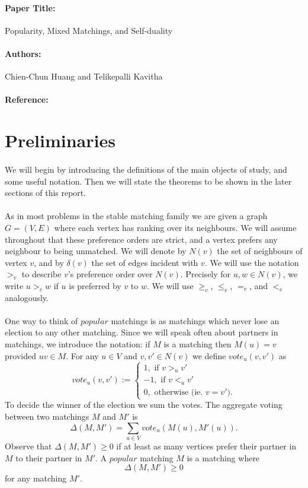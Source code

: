 \documentclass[letterpaper,12pt,oneside,onecolumn]{article}
\begin{document}
\paragraph{Paper Title:} Popularity, Mixed Matchings, and Self-duality
\paragraph{Authors:} Chien-Chun Huang and Telikepalli Kavitha
\paragraph{Reference:} \cite{huang2017popularity}

\section{Preliminaries}
\paragraph{}
We will begin by introducing the definitions of the main objects of study, and some useful notation. Then we will state the theorems to be shown in the later sections of this report.
\paragraph{}
As in most problems in the stable matching family we are given a graph $G=(V,E)$ where each vertex has ranking over its neighbours. We will assume throughout that these preference orders are strict, and a vertex prefers any neighbour to being unmatched. We will denote by $N(v)$ the set of neighbours of vertex $v$, and by $\delta(v)$ the set of edges incident with $v$. We will use the notation $>_v$ to describe $v$'s preference order over $N(v)$. Precisely for $u, w \in N(v)$, we write $u >_v w$ if $u$ is preferred by $v$ to $w$. We will use $\geq_v$, $\leq_v$, $=_v$, and $<_v$ analogously.
\paragraph{}
One way to think of $\textit{popular}$ matchings is as matchings which never lose an election to any other matching. Since we will speak often about partners in matchings, we introduce the notation: if $M$ is a matching then $M(u) = v$ provided $uv \in M$. For any $u \in V$ and $v,v' \in N(v)$ we define $vote_u(v,v')$ as
$$vote_u(v,v') := \begin{cases}
1, \text{ if } v >_u v' \\
-1, \text{ if } v <_u v' \\
0, \text{ otherwise (ie. } v = v').
\end{cases}$$
To decide the winner of the election we sum the votes. The aggregate voting between two matchings $M$ and $M'$ is
$$\Delta(M, M') = \sum_{u \in V} vote_u(M(u), M'(u)).$$
Observe that $\Delta(M,M') \geq 0$ if at least as many vertices prefer their partner in $M$ to their partner in $M'$. A $\textit{popular}$ matching $M$ is  a matching where
$$\Delta(M, M') \geq 0$$
for any matching $M'$.
\end{document}
